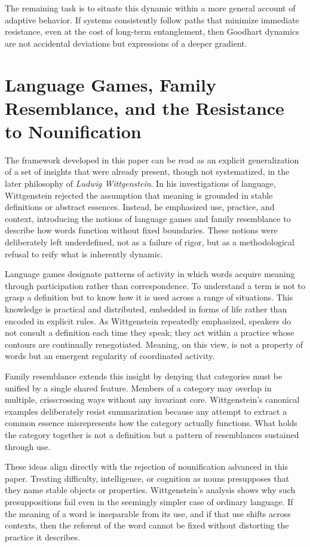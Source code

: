 \documentclass[12pt]{article}
\begin{document}
The remaining task is to situate this dynamic within a more general account of adaptive behavior. If systems consistently follow paths that minimize immediate resistance, even at the cost of long-term entanglement, then Goodhart dynamics are not accidental deviations but expressions of a deeper gradient.

\section{Language Games, Family Resemblance, and the Resistance to Nounification}

The framework developed in this paper can be read as an explicit generalization of a set of insights that were already present, though not systematized, in the later philosophy of \emph{Ludwig Wittgenstein}. In his investigations of language, Wittgenstein rejected the assumption that meaning is grounded in stable definitions or abstract essences. Instead, he emphasized use, practice, and context, introducing the notions of language games and family resemblance to describe how words function without fixed boundaries. These notions were deliberately left underdefined, not as a failure of rigor, but as a methodological refusal to reify what is inherently dynamic.

Language games designate patterns of activity in which words acquire meaning through participation rather than correspondence. To understand a term is not to grasp a definition but to know how it is used across a range of situations. This knowledge is practical and distributed, embedded in forms of life rather than encoded in explicit rules. As Wittgenstein repeatedly emphasized, speakers do not consult a definition each time they speak; they act within a practice whose contours are continually renegotiated. Meaning, on this view, is not a property of words but an emergent regularity of coordinated activity.

Family resemblance extends this insight by denying that categories must be unified by a single shared feature. Members of a category may overlap in multiple, crisscrossing ways without any invariant core. Wittgenstein’s canonical examples deliberately resist summarization because any attempt to extract a common essence misrepresents how the category actually functions. What holds the category together is not a definition but a pattern of resemblances sustained through use.

These ideas align directly with the rejection of nounification advanced in this paper. Treating difficulty, intelligence, or cognition as nouns presupposes that they name stable objects or properties. Wittgenstein’s analysis shows why such presuppositions fail even in the seemingly simpler case of ordinary language. If the meaning of a word is inseparable from its use, and if that use shifts across contexts, then the referent of the word cannot be fixed without distorting the practice it describes.
\end{document}

